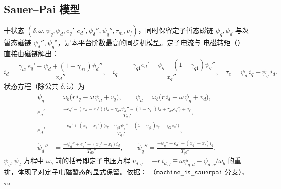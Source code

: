 \subsection{Sauer--Pai 模型}
\label{sec:dynamics-machine-sauerpai}
十状态 $(\delta,\omega,\psi_q,\psi_d,e_q',e_d',\psi_d'',\psi_q'',\tau_m,v_f)$，同时保留定子暂态磁链
$\psi_q,\psi_d$ 与次暂态磁链 $\psi_d'',\psi_q''$，是本平台阶数最高的同步机模型。定子电流与
电磁转矩（）直接由磁链解出：
\begin{equation}
 i_d=\frac{\gamma_{d1}e_q'-\psi_d+(1-\gamma_{d1})\psi_d''}{x_d''},\quad
 i_q=\frac{-\gamma_{q1}e_d'-\psi_q+(1-\gamma_{q1})\psi_q''}{x_q''},\quad
 \tau_e=\psi_d\,i_q-\psi_q\,i_d.
\end{equation}
状态方程（除公共 $\dot\delta,\dot\omega$）为
\begin{align}
 \dot\psi_q &= \omega_b\big(r\,i_q-\omega\,\psi_d+v_q\big),\qquad
 \dot\psi_d = \omega_b\big(r\,i_d+\omega\,\psi_q+v_d\big),\\
 \dot e_q' &= \frac{-e_q'-(x_d-x_d')\big(i_d-\gamma_{d2}\psi_d''-(1-\gamma_{d1})i_d+\gamma_{d2}e_q'\big)+v_f}{T_{d0}'},\\
 \dot e_d' &= \frac{-e_d'+(x_q-x_q')\big(i_q-\gamma_{q2}\psi_q''-(1-\gamma_{q1})i_q-\gamma_{d2}e_d'\big)}{T_{q0}'},\\
 \dot\psi_d'' &= \frac{-\psi_d''+e_q'-(x_d'-x_l)i_d}{T_{d0}''},\qquad
 \dot\psi_q'' = \frac{-\psi_q''-e_d'-(x_q'-x_l)i_q}{T_{q0}''}.
\end{align}
$\psi_q,\psi_d$ 方程中 $\omega_b$ 前的括号即定子电压方程 $v_{d,q}=-r\,i_{d,q}\mp\omega\psi_{q,d}-\dot\psi_{d,q}/\omega_b$
的重排，体现了对定子电磁暂态的显式保留。依据：
（\texttt{machine\_is\_sauerpai} 分支）、
、。

